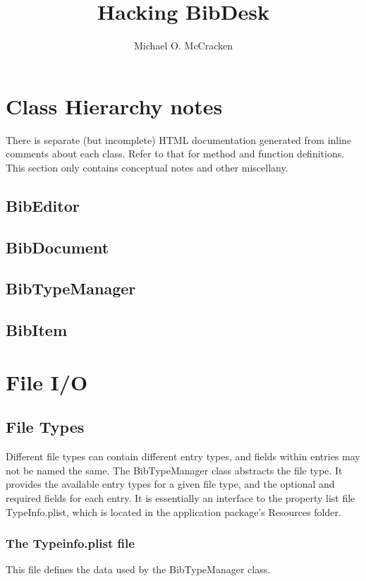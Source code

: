\documentclass[11pt]{book}
\title{Hacking BibDesk}
\author{Michael O. McCracken}
\newif\ifpdf
\begin{document}
\ifpdf
\DeclareGraphicsExtensions{.pdf, .jpg, .tif}
\else
{}
\fi

\maketitle

\tableofcontents

\chapter{Class Hierarchy notes}
There is separate (but incomplete) HTML documentation generated from inline comments about each class. Refer to that for method and function definitions. This section only contains conceptual notes and other miscellany.

\section{BibEditor}
\section{BibDocument}
\section{BibTypeManager}
\section{BibItem}

\chapter{File I/O}

\section{File Types}
Different file types can contain different entry types, and fields within entries may not be named the same. The BibTypeManager class abstracts the file type.
It provides the available entry types for a given file type, and the optional and required fields for each entry. It is essentially an interface to the property list file TypeInfo.plist, which is located in the application package's Resources folder.

\subsection{The Typeinfo.plist file}
This file defines the data used by the BibTypeManager class.
\end{document}
